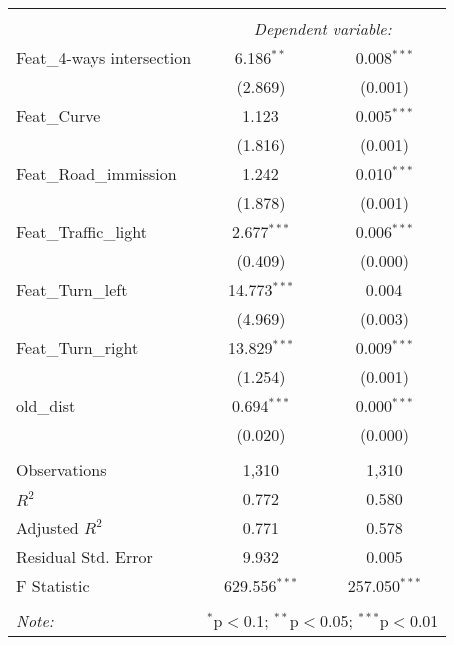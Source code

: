 \begin{table}[!htbp] \centering
\begin{tabular}{@{\extracolsep{5pt}}lcc}
\\[-1.8ex]\hline
\hline \\[-1.8ex]
& \multicolumn{2}{c}{\textit{Dependent variable:}} \
\cr \cline{2-3}
\hline \\[-1.8ex]
 Feat_4-ways intersection & 6.186$^{**}$ & 0.008$^{***}$ \\
  & (2.869) & (0.001) \\
 Feat_Curve & 1.123$^{}$ & 0.005$^{***}$ \\
  & (1.816) & (0.001) \\
 Feat_Road_immission & 1.242$^{}$ & 0.010$^{***}$ \\
  & (1.878) & (0.001) \\
 Feat_Traffic_light & 2.677$^{***}$ & 0.006$^{***}$ \\
  & (0.409) & (0.000) \\
 Feat_Turn_left & 14.773$^{***}$ & 0.004$^{}$ \\
  & (4.969) & (0.003) \\
 Feat_Turn_right & 13.829$^{***}$ & 0.009$^{***}$ \\
  & (1.254) & (0.001) \\
 old_dist & 0.694$^{***}$ & 0.000$^{***}$ \\
  & (0.020) & (0.000) \\
\hline \\[-1.8ex]
 Observations & 1,310 & 1,310 \\
 $R^2$ & 0.772 & 0.580 \\
 Adjusted $R^2$ & 0.771 & 0.578 \\
 Residual Std. Error & 9.932 & 0.005  \\
 F Statistic & 629.556$^{***}$  & 257.050$^{***}$  \\
\hline
\hline \\[-1.8ex]
\textit{Note:} & \multicolumn{2}{r}{$^{*}$p$<$0.1; $^{**}$p$<$0.05; $^{***}$p$<$0.01} \\
\end{tabular}
\end{table}
